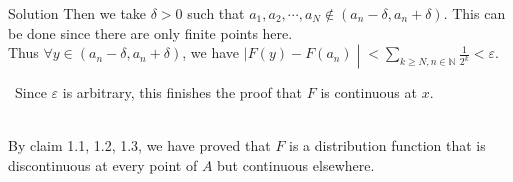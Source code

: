 \begin{qlsolution}{Solution}
Then we take \(\delta > 0\) such that \(a_{1},a_{2},\cdots,a_{N} \notin (a_{n} - \delta,a_{n} + \delta)\). This can be done since there are only finite points here.\\
Thus \(\forall y \in (a_{n} - \delta,a_{n} + \delta)\), we have \(\left. |F(y) - F(a_{n}) \middle| < \sum_{k \geq N,n \in \mathbb{N}}\frac{1}{2^{k}} < \varepsilon \right.\).\\
\strut ~Since \(\varepsilon\) is arbitrary, this finishes the proof that \(F\) is continuous at \(x\).\\
\strut \\
By claim 1.1, 1.2, 1.3, we have proved that \(F\) is a distribution function that is discontinuous at every point of \(A\) but continuous elsewhere.\\
\strut \\

\end{qlsolution}

